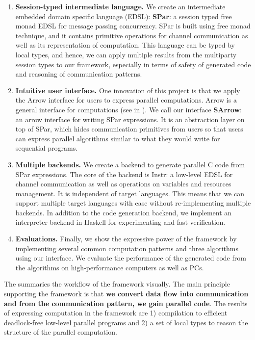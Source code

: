 \begin{enumerate}
    \item \textbf{Session-typed intermediate language. } We create an intermediate embedded domain specific language (EDSL): \textbf{SPar}: a session typed free monad EDSL for message passing concurrency. SPar is built using free monad technique, and it contains primitive operations for channel communication as well as its representation of computation. This language can be typed by local types, and hence, we can apply multiple results from the multiparty session types to our framework, especially in terms of safety of generated code and reasoning of communication patterns.
    \item \textbf{Intuitive user interface. } One innovation of this project is that we apply the Arrow interface for users to express parallel computations. Arrow is a general interface for computations (see in ). We call our interface \textbf{SArrow}: an arrow interface for writing SPar expressions. It is an abstraction layer on top of SPar, which hides communication primitives from users so that users can express parallel algorithms similar to what they would write for sequential programs.
    \item \textbf{Multiple backends. } We create a backend to generate parallel C code from SPar expressions. The core of the backend is Instr: a low-level EDSL for channel communication as well as operations on variables and resources management. It is independent of target languages. This means that we can support multiple target languages with ease without re-implementing multiple backends. In addition to the code generation backend, we implement an interpreter backend in Haskell for experimenting and fast verification.
    \item \textbf{Evaluations. } Finally, we show the expressive power of the framework by implementing several common computation patterns and three algorithms using our interface. We evaluate the performance of the generated code from the algorithms on high-performance computers as well as PCs. 
\end{enumerate}
The  summaries the workflow of the framework visually. The main principle supporting the framework is that \textbf{we convert data flow into communication and from the communication pattern, we gain parallel code}. The results of expressing computation in the framework are 1) compilation to efficient deadlock-free low-level parallel programs and 2) a set of local types to reason the structure of the parallel computation.

